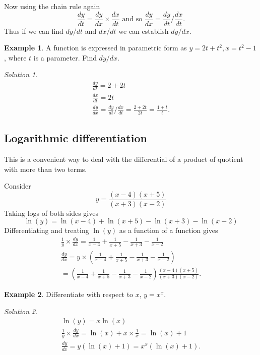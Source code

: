 \documentclass[
  11pt,
  oneside]{book}
\newcommand{\slide}{}
\theoremstyle{definition}
\theoremstyle{definition}
\newtheorem{example}{Example}[chapter]
\theoremstyle{definition}
\theoremstyle{definition}
\theoremstyle{remark}
\newtheorem*{solution}{Solution}
\begin{document}
Now using the chain rule again
\[
\frac{dy}{dt} = \frac{dy}{dx}\times\frac{dx}{dt}\text{ and so }\frac{dy}{dx} = \frac{dy}{dt}/\frac{dx}{dt}.
\]
Thus if we can find \(dy/dt\) and \(dx/dt\) we can establish \(dy/dx\).

\slide

\begin{example}
A function is expressed in parametric form as \(y = 2t + t^2, x = t^2 - 1\), where \(t\) is a parameter. Find \(dy/dx\).
\end{example}

\begin{solution}
\begin{gather*}
\frac{dy}{dt} = 2+2t\\
\frac{dx}{dt} = 2t\\
\frac{dy}{dx} = \frac{dy}{dt}/\frac{dx}{dt} = \frac{2+2t}{2t} = \frac{1+t}{t}.
\end{gather*}
\end{solution}

\slide

\subsection{Logarithmic differentiation}\label{logarithmic-differentiation}

This is a convenient way to deal with the differential of a product of quotient with more than two terms.

Consider
\[
y = \frac{(x-4)(x+5)}{(x+3)(x-2)}
\]
Taking logs of both sides gives
\[
\ln(y) = \ln(x-4)+\ln(x+5)-\ln(x+3)-\ln(x-2)
\]
Differentiating and treating \(\ln(y)\) as a function of a function gives
\begin{gather*}
\frac 1y\times\frac{dy}{dx} = \frac{1}{x-4}+\frac{1}{x+5}-\frac{1}{x+3}-\frac{1}{x-2}\\
\frac{dy}{dx} = y\times\left(\frac{1}{x-4}+\frac{1}{x+5}-\frac{1}{x+3}-\frac{1}{x-2}\right)\\
= \left(\frac{1}{x-4}+\frac{1}{x+5}-\frac{1}{x+3}-\frac{1}{x-2}\right)\frac{(x-4)(x+5)}{(x+3)(x-2)}.
\end{gather*}

\begin{example}
Differentiate with respect to \(x\), \(y=x^x\).
\end{example}

\begin{solution}
\begin{gather*}
\ln(y) = x\ln(x)\\
\frac{1}{y}\times\frac{dy}{dx} = \ln(x)+x\times\frac{1}{x} = \ln(x)+1\\
\frac{dy}{dx} = y(\ln(x)+1) = x^x(\ln(x)+1).
\end{gather*}
\end{solution}
\end{document}
